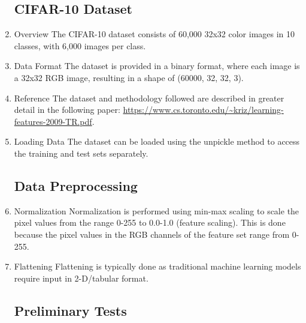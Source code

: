 \documentclass[a4paper]{article}
\theoremstyle{plain}
\theoremstyle{definition}
\begin{document}
\begin{enumerate}

\subsection{CIFAR-10 Dataset}

\item{Overview}
The CIFAR-10 dataset consists of 60,000 32x32 color images in 10 classes, with 6,000 images per class.

\item{Data Format}
The dataset is provided in a binary format, where each image is a 32x32 RGB image, resulting in a shape of (60000, 32, 32, 3).

\item{Reference}
The dataset and methodology followed are described in greater detail in the following paper: \url{https://www.cs.toronto.edu/~kriz/learning-features-2009-TR.pdf}.

\item{Loading Data}
The dataset can be loaded using the unpickle method to access the training and test sets separately.

\subsection{Data Preprocessing}


\item{Normalization}
Normalization is performed using min-max scaling to scale the pixel values from the range 0-255 to 0.0-1.0 (feature scaling). This is done because the pixel values in the RGB channels of the feature set range from 0-255.

\item{Flattening}
Flattening is typically done as traditional machine learning models require input in 2-D/tabular format.


\newpage
\subsection{Preliminary Tests}


\end{enumerate}
\end{document}
